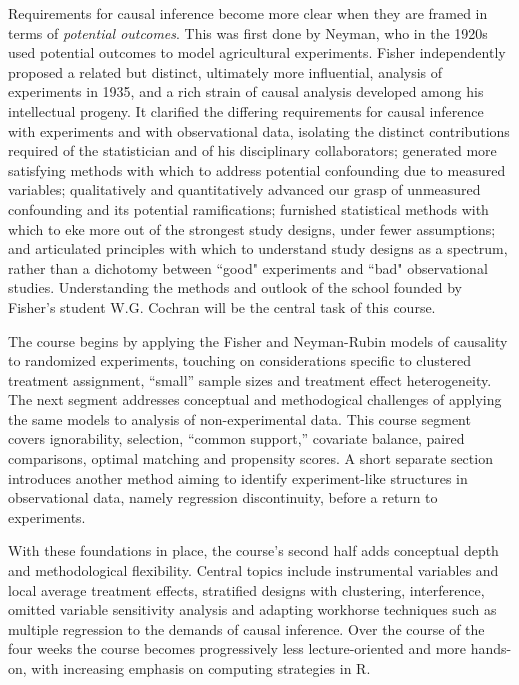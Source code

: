 \documentclass[12pt]{article}
\begin{document}
Requirements for causal inference become more clear when they are
framed in terms of \emph{potential outcomes}.  This was first done by
Neyman, who in the 1920s used potential outcomes to model agricultural
experiments.  Fisher independently proposed a related but distinct,
ultimately more influential, analysis of experiments in 1935, and a
rich strain of causal analysis developed among his intellectual
progeny.  It clarified the differing requirements for causal inference
with experiments and with observational data, isolating the distinct
contributions required of the statistician and of his disciplinary
collaborators; generated more satisfying methods with which to address
potential confounding due to measured variables; qualitatively and
quantitatively advanced our grasp of unmeasured confounding and its
potential ramifications; furnished statistical methods with which to
eke more out of the strongest study designs, under fewer assumptions;
and articulated principles with which to understand study designs as a
spectrum, rather than a dichotomy between ``good" experiments and
``bad" observational studies. Understanding the methods and outlook of
the school founded by Fisher's student W.G. Cochran will be the
central task of this course.

The course begins by applying the Fisher and Neyman-Rubin models of
causality to randomized experiments, touching on considerations
specific to clustered treatment assignment, ``small'' sample sizes and
treatment effect heterogeneity.  The next segment addresses conceptual
and methodogical challenges of applying the same models to analysis of
non-experimental data. This course segment covers ignorability,
selection, ``common support,'' covariate balance, paired comparisons,
optimal matching and propensity scores. A short separate section
introduces another method aiming to identify experiment-like
structures in observational data, namely regression discontinuity,
before a return to experiments.

With these foundations in place, the course's second half adds
conceptual depth and methodological flexibility. 
Central topics include instrumental variables and local average
treatment effects, stratified designs with clustering, interference,
omitted variable sensitivity analysis and adapting workhorse
techniques such as multiple regression to the demands of causal
inference.  Over the course of the four weeks the course becomes
progressively less lecture-oriented and more hands-on, with increasing
emphasis on computing strategies in R.
\end{document}
